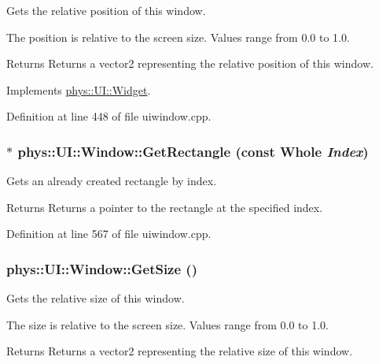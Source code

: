 Gets the relative position of this window. 

The position is relative to the screen size. Values range from 0.0 to 1.0. \begin{DoxyReturn}{Returns}
Returns a vector2 representing the relative position of this window. 
\end{DoxyReturn}


Implements \hyperlink{classphys_1_1UI_1_1Widget_a3e464b028b0d1b5755923b8790260c33}{phys::UI::Widget}.



Definition at line 448 of file uiwindow.cpp.

\hypertarget{classphys_1_1UI_1_1Window_a5cd67d1e89ceb52663f472e110e978b1}{
\subsubsection[{GetRectangle}]{ $\ast$ phys::UI::Window::GetRectangle (const {\bf Whole} {\em Index})}}
\label{d4/d86/classphys_1_1UI_1_1Window_a5cd67d1e89ceb52663f472e110e978b1}


Gets an already created rectangle by index. 

\begin{DoxyReturn}{Returns}
Returns a pointer to the rectangle at the specified index. 
\end{DoxyReturn}


Definition at line 567 of file uiwindow.cpp.

\hypertarget{classphys_1_1UI_1_1Window_a9946100eb6e6e985921bbea9e87cede3}{
\subsubsection[{GetSize}]{ phys::UI::Window::GetSize ()}}
\label{d4/d86/classphys_1_1UI_1_1Window_a9946100eb6e6e985921bbea9e87cede3}


Gets the relative size of this window. 

The size is relative to the screen size. Values range from 0.0 to 1.0. \begin{DoxyReturn}{Returns}
Returns a vector2 representing the relative size of this window. 
\end{DoxyReturn}


